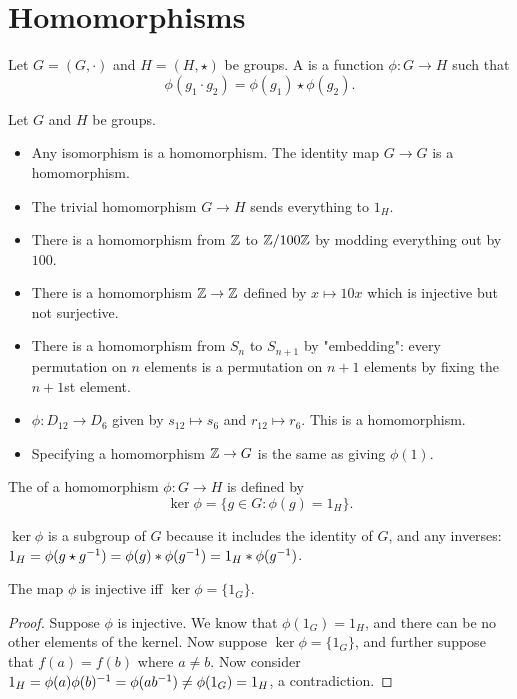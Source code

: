 \documentclass[11pt]{scrreport}
\begin{document}
\section{Homomorphisms}
\begin{definition}
    Let $G=(G,\cdot)$ and $H=(H,\star)$ be groups. A  is a function $\phi: G\to H$ such that \[\phi(g_1\cdot g_2) =\phi(g_1)\star\phi(g_2).\]
\end{definition}
\begin{example}
    Let $G$ and $H$ be groups.
    \begin{itemize}
        \item Any isomorphism is a homomorphism. The identity map $G\to G$ is a homomorphism.
        \item The trivial homomorphism $G\to H$ sends everything to $1_H$.
        \item There is a homomorphism from $\mathbb Z$ to $\mathbb Z/100\mathbb Z$ by modding everything out by $100$.
        \item There is a homomorphism $\mathbb Z\to\mathbb Z$ defined by $x\mapsto 10x$ which is injective but not surjective.
        \item There is a homomorphism from $S_n$ to $S_{n+1}$ by "embedding": every permutation on $n$ elements is a permutation on $n+1$ elements by fixing the $n+1$st element.
        \item $\phi: D_{12}\to D_6$ given by $s_{12}\mapsto s_6$ and $r_{12}\mapsto r_6$. This is a homomorphism.
        \item Specifying a homomorphism $\mathbb Z\to G$ is the same as giving $\phi(1)$.
    \end{itemize}
\end{example}
\begin{definition}
    The  of a homomorphism $\phi: G\to H$ is defined by \[\ker\phi = \{g\in G : \phi(g)=1_H\}.\]
\end{definition}
\begin{remark}
    $\ker\phi$ is a subgroup of $G$ because it includes the identity of $G$, and any inverses: $1_H=\phi(g \star g^{-1}) = \phi(g)\ast \phi(g^{-1}) = 1_H \ast \phi(g^{-1})$.
\end{remark}
\begin{proposition}
    The map $\phi$ is injective iff $\ker\phi = \{1_G\}$.
\end{proposition}
\begin{proof}
    Suppose $\phi$ is injective. We know that $\phi(1_G)=1_H$, and there can be no other elements of the kernel. Now suppose $\ker\phi = \{1_G\}$, and further suppose that $f(a)=f(b)$ where $a\neq b$. Now consider $1_H=\phi(a)\phi(b)^{-1}=\phi(ab^{-1}) \neq \phi(1_G)=1_H$, a contradiction.
\end{proof}
\end{document}
